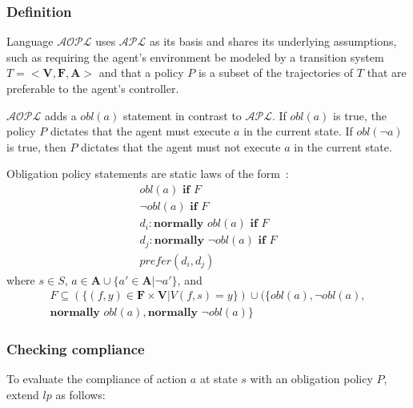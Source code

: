 \subsubsection{Definition}

Language $\mathcal{AOPL}$ uses $\mathcal{APL}$ as its basis and shares its underlying assumptions, such as requiring the agent's environment be modeled by a transition system $T=<\boldsymbol{V}, \boldsymbol{F}, \boldsymbol{A}>$ and that a policy $P$ is a subset of the trajectories of $T$ that are preferable to the agent's controller.

$\mathcal{AOPL}$ adds a $obl(a)$ statement in contrast to $\mathcal{APL}$.
If $obl(a)$ is true, the policy $P$ dictates that the agent must execute $a$ in the current state.
If $obl(\neg a)$ is true, then $P$ dictates that the agent must not execute $a$ in the current state.

\begin{definition}
    Obligation policy statements are static laws of the form~\citep{gelfond_authorization_2008}:
    \begin{gather*}
        obl\left(a\right) \textbf{ if } F \\
        \neg obl\left(a\right) \textbf{ if } F \\
        d_i: \textbf{normally } obl(a) \textbf{ if } F \\
        d_j: \textbf{normally } \neg obl(a) \textbf{ if } F \\
        prefer(d_i, d_j)
    \end{gather*}
    where $s \in S$, $a \in \boldsymbol{A} \cup \{a' \in \boldsymbol{A} | \neg a'\}$, and
    \begin{multline*}
        F\subseteq\left(\{(f, y) \in \boldsymbol{F} \times \boldsymbol{V} | V(f,s)=y\}\right) \cup (\{obl(a),
            \neg obl(a), \\
            \textbf{normally } obl(a),
            \textbf{normally } \neg obl(a)\}
    \end{multline*}
\end{definition}

\subsubsection{Checking compliance}

To evaluate the compliance of action $a$ at state $s$ with an obligation policy $P$, \citet{gelfond_authorization_2008} extend $lp$ as follows:

